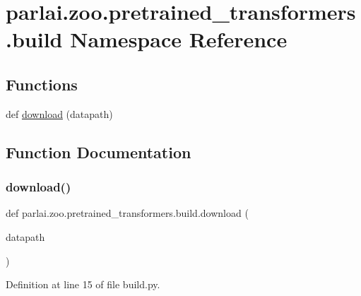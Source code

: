 \hypertarget{namespaceparlai_1_1zoo_1_1pretrained__transformers_1_1build}{}\section{parlai.\+zoo.\+pretrained\+\_\+transformers.\+build Namespace Reference}
\label{namespaceparlai_1_1zoo_1_1pretrained__transformers_1_1build}
\subsection*{Functions}
\begin{DoxyCompactItemize}
\item 
def \hyperlink{namespaceparlai_1_1zoo_1_1pretrained__transformers_1_1build_afaead0deab400e1c516706e85dd4ed9b}{download} (datapath)
\end{DoxyCompactItemize}


\subsection{Function Documentation}
\mbox{\label{namespaceparlai_1_1zoo_1_1pretrained__transformers_1_1build_afaead0deab400e1c516706e85dd4ed9b}} 
\subsubsection{\texorpdfstring{download()}{download()}}
{\footnotesize\ttfamily def parlai.\+zoo.\+pretrained\+\_\+transformers.\+build.\+download (\begin{DoxyParamCaption}\item[{}]{datapath }\end{DoxyParamCaption})}



Definition at line 15 of file build.\+py.


